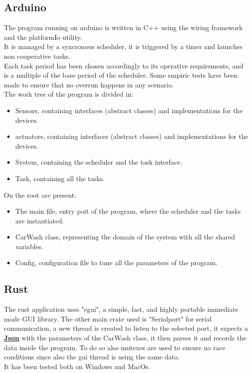 \subsection{Arduino}
The program running on arduino is written in C++ using the wiring framework and the platformIo utility.\\
It is managed by a syncronous scheduler, it is triggered by a timer and launches non cooperative tasks.\\
Each task period has been chosen accordingly to its operative requirements, and is a multiple of the base period of the scheduler.
Some empiric tests have been made to ensure that no overrun happens in any scenario.\\
The work tree of the program is divided in:
\begin{itemize}
    \item Sensors, containing interfaces (abstract classes) and implementations for the devices.
    \item actuators, containing interfaces (abstract classes) and implementations for the devices.
    \item System, containing the scheduler and the task interface.
    \item Task, containing all the tasks.
\end{itemize}
On the root are present:
\begin{itemize}
    \item The main file, entry poit of the program, where the scheduler and the tasks are instantiated.
    \item CarWash class, representing the domain of the system with all the shared variables.
    \item Config, configuration file to tune all the parameters of the program.
\end{itemize}
\subsection{Rust}
The rust application uses "egui", a simple, fast, and highly portable immediate mode GUI library.
The other main crate used is "Serialport" for serial communication, a new thread is created to listen to the selected port,
it expects a \underline{\textbf{Json}} with the parameters of the CarWash class, it then parses it and records the data inside the program.
To do so also mutexes are used to ensure no race conditions since also the gui thread is using the same data.\\
It has been tested both on Windows and MacOs.
\pagebreak

